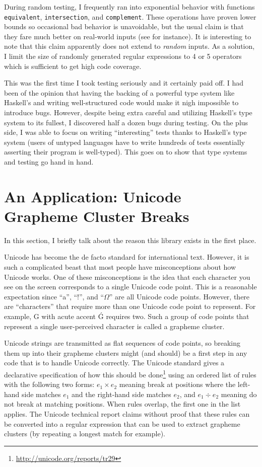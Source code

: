 \documentclass[11pt]{article}
\newcommand{\haskell}{\lstinline}
\begin{document}
During random testing, I frequently ran into exponential behavior with functions \haskell{equivalent}, \haskell{intersection}, and \haskell{complement}. These operations have proven lower bounds \cite{Kozen77,GeladeN12} so occasional bad behavior is unavoidable, but the usual claim is that they fare much better on real-world inputs (see \cite{FosterKM0T15} for instance). It is interesting to note that this claim apparently does not extend to \emph{random} inputs. As a solution, I limit the size of randomly generated regular expressions to 4 or 5 operators which is sufficient to get high code coverage.

This was the first time I took testing seriously and it certainly paid off. I had been of the opinion that having the backing of a powerful type system like Haskell's and writing well-structured code would make it nigh impossible to introduce bugs. However, despite being extra careful and utilizing Haskell's type system to its fullest, I discovered half a dozen bugs during testing. On the plus side, I was able to focus on writing ``interesting'' tests thanks to Haskell's type system (users of untyped languages have to write hundreds of tests essentially asserting their program is well-typed). This goes on to show that type systems and testing go hand in hand.

\section{An Application: Unicode Grapheme Cluster Breaks}\label{application}

In this section, I briefly talk about the reason this library exists in the first place.

Unicode has become the de facto standard for international text. However, it is such a complicated beast that most people have misconceptions about how Unicode works. One of these misconceptions is the idea that each character you see on the screen corresponds to a single Unicode code point. This is a reasonable expectation since ``a'', ``!'', and ``$\Omega$'' are all Unicode code points. However, there are ``characters'' that require more than one Unicode code point to represent. For example, G with acute accent \'G requires two. Such a group of code points that represent a single user-perceived character is called a grapheme cluster.

Unicode strings are transmitted as flat sequences of code points, so breaking them up into their grapheme clusters might (and should) be a first step in any code that is to handle Unicode correctly. The Unicode standard gives a declarative specification of how this should be done\footnote{\url{http://unicode.org/reports/tr29}} using an ordered list of rules with the following two forms: $e_1 \times e_2$ meaning break at positions where the left-hand side matches $e_1$ and the right-hand side matches $e_2$, and $e_1 \div e_2$ meaning do not break at matching positions. When rules overlap, the first one in the list applies. The Unicode technical report claims without proof that these rules can be converted into a regular expression that can be used to extract grapheme clusters (by repeating a longest match for example).
\end{document}
